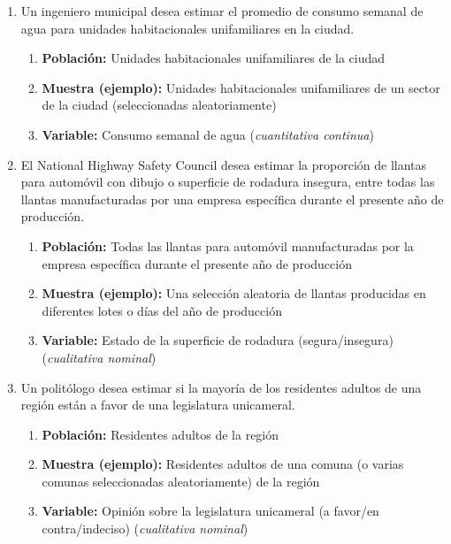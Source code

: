 \documentclass[12pt, letterpaper]{article}
\begin{document}
\begin{enumerate}
    \item Un ingeniero municipal desea estimar el promedio de consumo semanal de agua para unidades habitacionales unifamiliares en la ciudad.
        \begin{enumerate}
            \item \textbf{Población:} Unidades habitacionales unifamiliares de la ciudad
            \item \textbf{Muestra (ejemplo):} Unidades habitacionales unifamiliares de un sector de la ciudad (seleccionadas aleatoriamente)
            \item \textbf{Variable:} Consumo semanal de agua (\textit{cuantitativa continua})
        \end{enumerate}
    \item El National Highway Safety Council desea estimar la proporción de llantas para automóvil con dibujo o superficie de rodadura insegura, entre todas las llantas manufacturadas por una empresa específica durante el presente año de producción.
        \begin{enumerate}
            \item \textbf{Población:} Todas las llantas para automóvil manufacturadas por la empresa específica durante el presente año de producción
            \item \textbf{Muestra (ejemplo):} Una selección aleatoria de llantas producidas en diferentes lotes o días del año de producción
            \item \textbf{Variable:} Estado de la superficie de rodadura (segura/insegura) (\textit{cualitativa nominal})
        \end{enumerate}

    \item Un politólogo desea estimar si la mayoría de los residentes adultos de una región están a favor de una legislatura unicameral.
        \begin{enumerate}
            \item \textbf{Población:} Residentes adultos de la región
            \item \textbf{Muestra (ejemplo):} Residentes adultos de una comuna (o varias comunas seleccionadas aleatoriamente) de la región
            \item \textbf{Variable:} Opinión sobre la legislatura unicameral (a favor/en contra/indeciso) (\textit{cualitativa nominal})
        \end{enumerate}


\end{enumerate}
\end{document}

